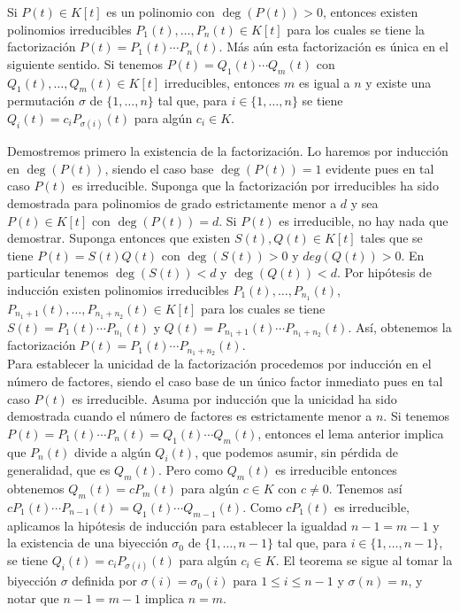 \begin{teo}
Si $P(t)\in K[t]$ es un polinomio con $\deg(P(t))>0$, entonces existen polinomios irreducibles $P_1(t),\ldots,P_n(t)\in K[t]$ para los cuales se tiene la factorizaci\'on $P(t)=P_1(t)\cdots P_n(t)$. M\'as a\'un esta factorizaci\'on es \'unica en el siguiente sentido. Si tenemos $P(t)=Q_1(t)\cdots Q_m(t)$ con $Q_1(t),\ldots,Q_m(t)\in K[t]$ irreducibles, entonces $m$ es igual a $n$ y existe una permutaci\'on $\sigma$ de $\{1,\ldots,n\}$ tal que, para $i\in\{1,\ldots,n\}$ se tiene $Q_i(t)=c_iP_{\sigma(i)}(t)$ para alg\'un $c_i\in K$.
\end{teo}

\dem Demostremos primero la existencia de la factorizaci\'on. Lo haremos por inducci\'on en $\deg(P(t))$, siendo el caso base $\deg(P(t))=1$ evidente pues en tal caso $P(t)$ es irreducible. Suponga que la factorizaci\'on por irreducibles ha sido demostrada para polinomios de grado estrictamente menor a $d$ y sea $P(t)\in K[t]$ con $\deg(P(t))=d$. Si $P(t)$ es irreducible, no hay nada que demostrar. Suponga entonces que existen $S(t),Q(t)\in K[t]$ tales que se tiene $P(t)=S(t)Q(t)$ con $\deg(S(t))>0$ y $deg(Q(t))>0$. En particular tenemos $\deg(S(t))<d$ y $\deg(Q(t))<d$. Por hip\'otesis de inducci\'on existen polinomios irreducibles $P_1(t),\ldots,P_{n_1}(t)$, $P_{n_1+1}(t),\ldots,P_{n_1+n_2}(t)\in K[t]$ para los cuales se tiene $S(t)=P_1(t)\cdots P_{n_1}(t)$ y $Q(t)=P_{n_1+1}(t)\cdots P_{n_1+n_2}(t)$.
As\'i, obtenemos la factorizaci\'on $P(t)=P_1(t)\cdots P_{n_1+n_2}(t)$.\\
Para establecer la unicidad de la factorizaci\'on procedemos por inducci\'on en el n\'umero de factores, siendo el caso base de un \'unico factor inmediato pues en tal caso $P(t)$ es irreducible. Asuma por inducci\'on que la unicidad ha sido demostrada cuando el n\'umero de factores es estrictamente menor a $n$. Si tenemos $P(t)=P_1(t)\cdots P_n(t)=Q_1(t)\cdots Q_m(t)$, entonces el lema anterior implica que $P_n(t)$ divide a alg\'un $Q_i(t)$, que podemos asumir, sin p\'erdida de generalidad, que es $Q_m(t)$. Pero como $Q_m(t)$ es irreducible entonces obtenemos $Q_m(t)=cP_m(t)$ para alg\'un $c\in K$ con $c\ne 0$. Tenemos as\'i $cP_1(t)\cdots P_{n-1}(t)=Q_1(t)\cdots Q_{m-1}(t)$. Como $cP_1(t)$ es irreducible, aplicamos la hip\'otesis de inducci\'on para establecer la igualdad $n-1=m-1$ y la existencia de una biyecci\'on $\sigma_0$ de $\{1,\ldots,n-1\}$ tal que, para $i\in\{1,\ldots,n-1\}$, se tiene $Q_i(t)=c_iP_{\sigma(i)}(t)$ para alg\'un $c_i\in K$. El teorema se sigue al tomar la biyecci\'on $\sigma$ definida por $\sigma(i)=\sigma_0(i)$ para $1\le i\le n-1$ y $\sigma(n)=n$, y notar que $n-1=m-1$ implica $n=m$.

